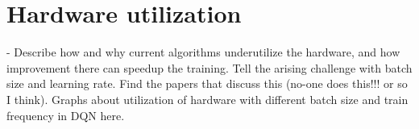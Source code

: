 \section{Hardware utilization}

- Describe how and why current algorithms underutilize the hardware, and how
  improvement there can speedup the training. Tell the arising challenge with
  batch size and learning rate. Find the papers that discuss this (no-one does
  this!!! or so I think). Graphs about utilization of hardware with
  different batch size and train frequency in DQN here.
